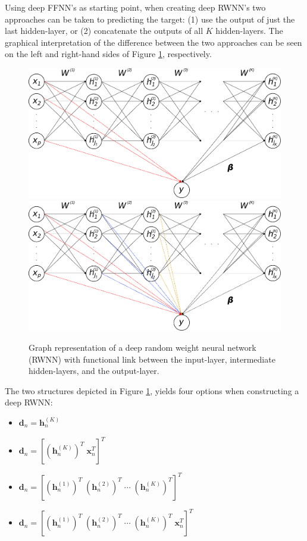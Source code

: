 \documentclass[
]{jss}
\begin{document}
Using deep FFNN's as starting point, when creating deep RWNN's two
approaches can be taken to predicting the target: (1) use the output of
just the last hidden-layer, or (2) concatenate the outputs of all \(K\)
hidden-layers. The graphical interpretation of the difference between
the two approaches can be seen on the left and right-hand sides of
Figure \ref{fig:deeprwnn}, respectively.

\begin{CodeChunk}
\begin{figure}[ht!]

{\centering \includegraphics[width=0.45\linewidth]{./Figures/deepRWNN} \includegraphics[width=0.45\linewidth]{./Figures/deepRWNNalt} 

}

\caption[Graph representation of a deep random weight neural network (RWNN) with functional link between the input-layer, intermediate hidden-layers, and the output-layer]{Graph representation of a deep random weight neural network (RWNN) with functional link between the input-layer, intermediate hidden-layers, and the output-layer.}\label{fig:deeprwnn}
\end{figure}
\end{CodeChunk}

The two structures depicted in Figure \ref{fig:deeprwnn}, yields four
options when constructing a deep RWNN:

\begin{itemize}
\item
  \(\boldsymbol{d}_n = \boldsymbol h_n^{(K)}\)
\item
  \(\boldsymbol{d}_n = [(\boldsymbol h_n^{(K)})^T \; \boldsymbol x_n^T]^T\)
\item
  \(\boldsymbol{d}_n = [(\boldsymbol h_n^{(1)})^T \; (\boldsymbol h_n^{(2)})^T \; \cdots \; (\boldsymbol h_n^{(K)})^T]^T\)
\item
  \(\boldsymbol{d}_n = [(\boldsymbol h_n^{(1)})^T \; (\boldsymbol h_n^{(2)})^T \; \cdots \; (\boldsymbol h_n^{(K)})^T \; \boldsymbol x_n^T]^T\)
\end{itemize}
\end{document}
